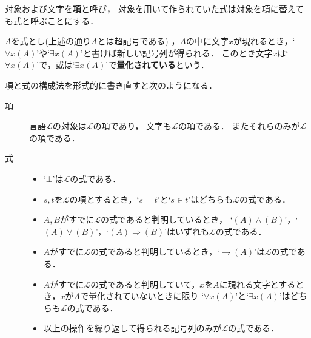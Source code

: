 	対象および文字を{\bf 項}と呼び，
	対象を用いて作られていた式は対象を項に替えても式と呼ぶことにする．
	
	$A$を式とし(上述の通り$A$とは超記号である)
	，$A$の中に文字$x$が現れるとき，`$\forall x (A)$'や`$\exists x (A)$'と書けば新しい記号列が得られる．
	このとき文字$x$は`$\forall x (A)$'で，或は`$\exists x (A)$'で{\bf 量化されている}という．
	
	項と式の構成法を形式的に書き直すと次のようになる．
	\begin{description}
		\item[項] 言語$\mathcal{L}$の対象は$\mathcal{L}$の項であり，
			文字も$\mathcal{L}$の項である．
			またそれらのみが$\mathcal{L}$の項である．
			
		\item[式] 
			\begin{itemize}
				\item `$\bot$'は$\mathcal{L}$の式である．
				
				\item $s,t$を$\mathcal{L}$の項とするとき，`$s=t$'と`$s \in t$'はどちらも$\mathcal{L}$の式である．
					
				\item $A,B$がすでに$\mathcal{L}$の式であると判明しているとき，
					`$(A) \wedge (B)$'，`$(A) \vee (B)$'，`$(A) \Longrightarrow (B)$'はいずれも$\mathcal{L}$の式である．
				
				\item $A$がすでに$\mathcal{L}$の式であると判明しているとき，`$\rightharpoondown (A)$'は$\mathcal{L}$の式である．
				
				\item $A$がすでに$\mathcal{L}$の式であると判明していて，$x$を$A$に現れる文字とするとき，$x$が$A$で量化されていないときに限り
					`$\forall x (A)$'と`$\exists x (A)$'はどちらも$\mathcal{L}$の式である．
				
				\item 以上の操作を繰り返して得られる記号列のみが$\mathcal{L}$の式である．
			\end{itemize}
	\end{description}
	
	\begin{comment}
		`$A$では量化されていないが$B$で量化されているといった文字が無いときに限り'という
		制限は何のためにあるのでしょうか．例えばこの制限を外すと
		\begin{align}
			(\forall x ((x \in x) \vee (\forall y (\exists x ( y = x )))))
		\end{align}
		は式となりますが，同じ式で文字$x$は二回量化されています．
		これでは式を解釈するときに厄介なので，このような状況を排除するために制約を設けているのですね．
		では，
	\end{comment}
	
